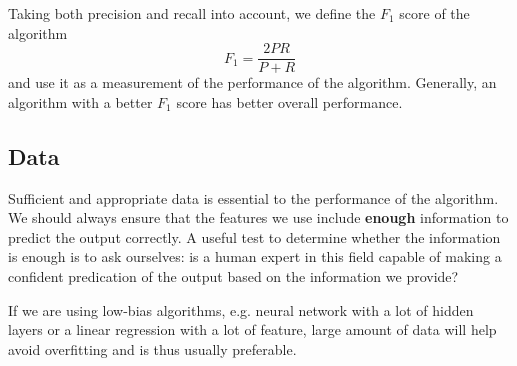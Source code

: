 Taking both precision and recall into account, we define the $F_1$ score of the algorithm
\begin{equation}
F_1 = \frac{2PR}{P+R}
\end{equation}
and use it as a measurement of the performance of the algorithm. Generally, an algorithm with a better $F_1$ score has better overall performance.
\subsection{Data}
Sufficient and appropriate data is essential to the performance of the algorithm. We should always ensure that the features we use include {\bf enough} information to predict the output correctly. A useful test to determine whether the information is enough is to ask ourselves: is a human expert in this field capable of making a confident predication of the output based on the information we provide?

If we are using low-bias algorithms, e.g. neural network with a lot of hidden layers or a linear regression with a lot of feature, large amount of data will help avoid overfitting and is thus usually preferable.
\ifx\PREAMBLE\undefined

\fi